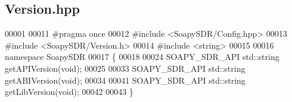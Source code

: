 \subsection{Version.\+hpp}
\label{Version_8hpp_source}

\begin{DoxyCode}
00001 
00011 \textcolor{preprocessor}{#pragma once}
00012 \textcolor{preprocessor}{#include <SoapySDR/Config.hpp>}
00013 \textcolor{preprocessor}{#include <SoapySDR/Version.h>}
00014 \textcolor{preprocessor}{#include <string>}
00015 
00016 \textcolor{keyword}{namespace }SoapySDR
00017 \{
00018 
00024 SOAPY_SDR_API std::string getAPIVersion(\textcolor{keywordtype}{void});
00025 
00033 SOAPY_SDR_API std::string getABIVersion(\textcolor{keywordtype}{void});
00034 
00041 SOAPY_SDR_API std::string getLibVersion(\textcolor{keywordtype}{void});
00042 
00043 \}
\end{DoxyCode}
